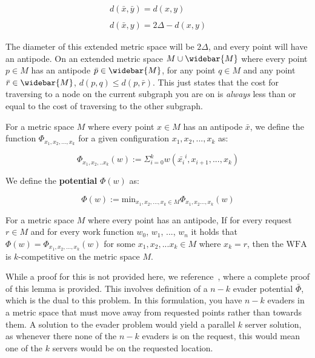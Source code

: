\begin{equation*}
    \begin{gathered}
        d(\bar{x}, \bar{y}) = d(x,y)\\ \\
        d(\bar{x}, y) = 2\Delta - d(x,y)
    \end{gathered}
\end{equation*}

The diameter of this extended metric space will be $2\Delta$, and every point will have an antipode. On an extended metric space $M \cup \widebar{M}$ where every point $p \in M$ has an antipode $\bar{p} \in \widebar{M}$, for any point $q \in M$ and any point $\bar{r} \in \widebar{M}$, $d(p,q) \leq d(p,\bar{r})$. This just states that the cost for traversing to a node on the current subgraph you are on is \textit{always} less than or equal to the cost of traversing to the other subgraph.

\begin{definition}
    For a metric space $M$ where every point $x \in M$ has an antipode $\bar{x}$, we define the function \textbf{$\Phi_{x_1, x_2, ..., x_k}$} for a given configuration $x_1, x_2, ..., x_k$ as:

    \begin{equation*}
        \Phi_{x_1, x_2, ..x_k}(w) := \Sigma_{i=0}^k w(\bar{x_i}^i, x_{i+1}, ..., x_k)
    \end{equation*}
\end{definition}

\begin{definition}
    We define the \textbf{potential} $\Phi (w)$ as:

    \begin{equation*}
        \Phi(w) := \mathrm{min}_{x_1, x_2, ..., x_k \in M} \Phi_{x_1, x_2..., x_k} (w)
    \end{equation*}
\end{definition}

\begin{lemma}
    For a metric space $M$ where every point has an antipode, If for every request $r \in M$ and for every work function $w_0$, $w_1$, ..., $w_n$ it holds that $\Phi(w) = \Phi_{x_1, x_2, ..., x_k}(w)$ for some $x_1, x_2, ...x_k \in M$ where $x_k = r$, then the $\mathrm{WFA}$ is $k$-competitive on the metric space $M$.
\end{lemma}

While a proof for this is not provided here, we reference~\cite{unifyingPotential2021}, where a complete proof of this lemma is provided. This involves definition of a $n-k$ evader potential $\bar{\Phi}$, which is the dual to this problem. In this formulation, you have $n-k$ evaders in a metric space that must move away from requested points rather than towards them. A solution to the evader problem would yield a parallel $k$ server solution, as whenever there none of the $n-k$ evaders is on the request, this would mean one of the $k$ servers would be on the requested location.